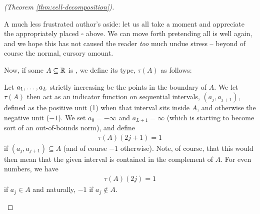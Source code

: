 \begin{proof}[\CD (Theorem \ref{thm:cell-decomposition})]
  \begin{svgraybox}
    A much less frustrated author's aside: let us all take a moment and appreciate the appropriately placed $\square$ above. We can move forth pretending all is well again, and we hope this has not caused the reader \emph{too} much undue stress -- beyond of course the normal, cursory amount.
  \end{svgraybox}

  Now, if some $A \subseteq \mathbb{R}$ is , we define its type, $\tau(A)$ as follows:
  \begin{description}
    \item Let $a_1, \hdots, a_{L}$ strictly increasing be the points in the boundary of $A$. We let $\tau(A)$ then act as an indicator function on sequential intervals, $(a_j, a_{j+1})$, defined as the positive unit (1) when that interval sits inside $A$, and otherwise the negative unit ($-1$). We set $a_0 = - \infty$ and $a_{L+1} = \infty$ (which is starting to become sort of an out-of-bounds norm), and define
    \begin{align*}
      \tau(A)(2j + 1) = 1
    \end{align*}
    if $(a_j, a_{j+1}) \subseteq A$ (and of course $-1$ otherwise). Note, of course, that this would then mean that the given interval is contained in the complement of $A$. For even numbers, we have
    \begin{align*}
      \tau(A)(2j) = 1
    \end{align*}
    if $a_j \in A$ and naturally, $-1$ if $a_j \not\in A$.


  \end{description}





\end{proof}




%
